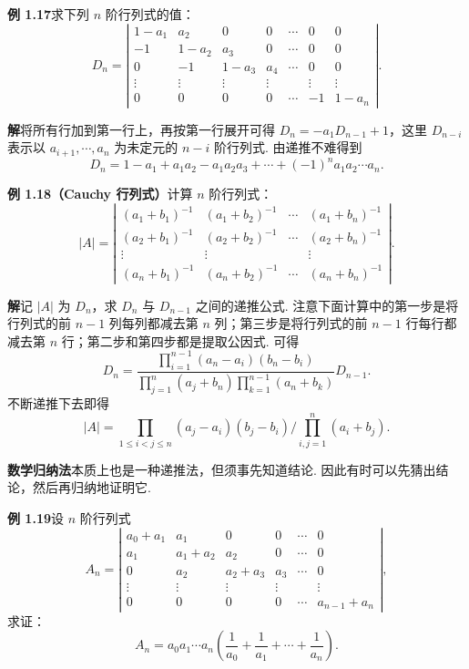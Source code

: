 \documentclass[UTF8,12pt,a4paper,fontset=fandol]{ctexart}
\begin{document}
\noindent\textbf{例 1.17}\quad 求下列 $n$ 阶行列式的值：
\[
D_n=\left|\begin{array}{ccccccc}
1-a_1 & a_2 & 0 & 0 & \cdots & 0 & 0\\
-1 & 1-a_2 & a_3 & 0 & \cdots & 0 & 0\\
0 & -1 & 1-a_3 & a_4 & \cdots & 0 & 0\\
\vdots & \vdots & \vdots & \vdots &        & \vdots & \vdots\\
0 & 0 & 0 & 0 & \cdots & -1 & 1-a_n
\end{array}\right|.
\]

\noindent\textbf{解}\quad 将所有行加到第一行上，再按第一行展开可得 $D_n=-a_1D_{n-1}+1$，这里 $D_{n-i}$ 表示以 $a_{i+1},\cdots,a_n$ 为未定元的 $n-i$ 阶行列式. 由递推不难得到
\[
D_n=1-a_1+a_1a_2-a_1a_2a_3+\cdots+(-1)^na_1a_2\cdots a_n.
\]

\noindent\textbf{例 1.18（Cauchy 行列式）}\quad 计算 $n$ 阶行列式：
\[
|A|=\left|\begin{array}{cccc}
(a_1+b_1)^{-1} & (a_1+b_2)^{-1} & \cdots & (a_1+b_n)^{-1}\\
(a_2+b_1)^{-1} & (a_2+b_2)^{-1} & \cdots & (a_2+b_n)^{-1}\\
\vdots & \vdots &        & \vdots\\
(a_n+b_1)^{-1} & (a_n+b_2)^{-1} & \cdots & (a_n+b_n)^{-1}
\end{array}\right|.
\]

\noindent\textbf{解}\quad 记 $|A|$ 为 $D_n$，求 $D_n$ 与 $D_{n-1}$ 之间的递推公式. 注意下面计算中的第一步是将行列式的前 $n-1$ 列每列都减去第 $n$ 列；第三步是将行列式的前 $n-1$ 行每行都减去第 $n$ 行；第二步和第四步都是提取公因式. 可得
\[
D_n=
\frac{\prod_{i=1}^{n-1}(a_n-a_i)(b_n-b_i)}
{\prod_{j=1}^n(a_j+b_n)\prod_{k=1}^{n-1}(a_n+b_k)}D_{n-1}.
\]
不断递推下去即得
\[
|A|=\prod_{1\le i<j\le n}(a_j-a_i)(b_j-b_i)\bigg/
\prod_{i,j=1}^n(a_i+b_j).
\]

\noindent\textbf{数学归纳法}\quad 本质上也是一种递推法，但须事先知道结论. 因此有时可以先猜出结论，然后再归纳地证明它.

\noindent\textbf{例 1.19}\quad 设 $n$ 阶行列式
\[
A_n=\left|\begin{array}{cccccc}
a_0+a_1 & a_1 & 0 & 0 & \cdots & 0\\
a_1 & a_1+a_2 & a_2 & 0 & \cdots & 0\\
0 & a_2 & a_2+a_3 & a_3 & \cdots & 0\\
\vdots & \vdots & \vdots & \vdots &        & \vdots\\
0 & 0 & 0 & 0 & \cdots & a_{n-1}+a_n
\end{array}\right|,
\]
求证：
\[
A_n=a_0a_1\cdots a_n\left(\frac1{a_0}+\frac1{a_1}+\cdots+\frac1{a_n}\right).
\]
\end{document}
